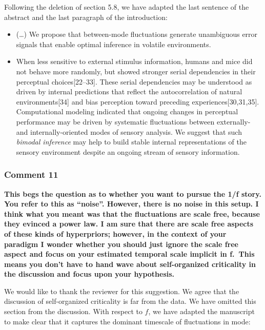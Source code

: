 \documentclass[
]{article}
\begin{document}
Following the deletion of section 5.8, we have adapted the last sentence
of the abstract and the last paragraph of the introduction:

\begin{itemize}
\item
  (\ldots) We propose that between-mode fluctuations generate
  unambiguous error signals that enable optimal inference in volatile
  environments.
\item
  When less sensitive to external stimulus information, humans and mice
  did not behave more randomly, but showed stronger serial dependencies
  in their perceptual choices{[}22--33{]}. These serial dependencies may
  be understood as driven by internal predictions that reflect the
  autocorrelation of natural environments{[}34{]} and bias perception
  toward preceding experiences{[}30,31,35{]}. Computational modeling
  indicated that ongoing changes in perceptual performance may be driven
  by systematic fluctuations between externally- and internally-oriented
  modes of sensory analysis. We suggest that such \emph{bimodal
  inference} may help to build stable internal representations of the
  sensory environment despite an ongoing stream of sensory information.
\end{itemize}

\hypertarget{comment-11}{%
\subsubsection{Comment 11}\label{comment-11}}

\textbf{This begs the question as to whether you want to pursue the 1/f
story. You refer to this as ``noise''. However, there is no noise in
this setup. I think what you meant was that the fluctuations are scale
free, because they evinced a power law. I am sure that there are scale
free aspects of these kinds of hyperpriors; however, in the context of
your paradigm I wonder whether you should just ignore the scale free
aspect and focus on your estimated temporal scale implicit in f.~This
means you don't have to hand wave about self-organized criticality in
the discussion and focus upon your hypothesis.}

We would like to thank the reviewer for this suggestion. We agree that
the discussion of self-organized criticality is far from the data. We
have omitted this section from the discussion. With respect to \(f\), we
have adapted the manuscript to make clear that it captures the dominant
timescale of fluctuations in mode:
\end{document}
